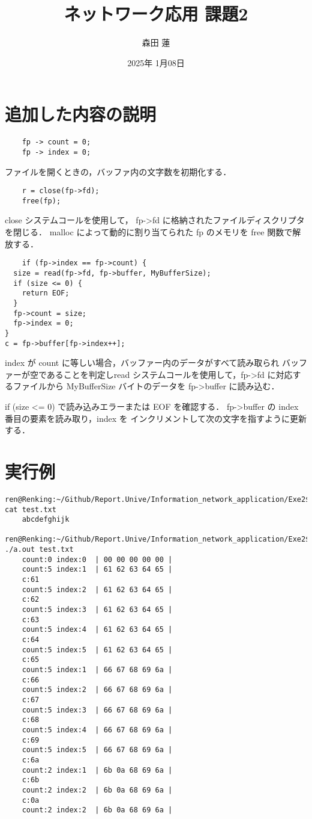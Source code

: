 \documentclass{jlreq}
\title{ネットワーク応用 課題2}
\author{森田 蓮}
\date{2025年 1月08日}
\begin{document}
\maketitle

\section{追加した内容の説明}
\begin{verbatim}
    fp -> count = 0;
    fp -> index = 0;
\end{verbatim}
ファイルを開くときの，バッファ内の文字数を初期化する．    

\begin{verbatim}
    r = close(fp->fd);
    free(fp);
\end{verbatim}

close システムコールを使用して，
fp->fd に格納されたファイルディスクリプタを閉じる．
malloc によって動的に割り当てられた fp のメモリを
free 関数で解放する．


\begin{verbatim}
    if (fp->index == fp->count) {
  size = read(fp->fd, fp->buffer, MyBufferSize);
  if (size <= 0) {
    return EOF;
  }
  fp->count = size;
  fp->index = 0;
}
c = fp->buffer[fp->index++];
\end{verbatim}
index が count に等しい場合，バッファー内のデータがすべて読み取られ
バッファーが空であることを判定しread システムコールを使用して，fp->fd
に対応するファイルから
 MyBufferSize バイトのデータを fp->buffer に読み込む．

 if (size <= 0) で読み込みエラーまたは EOF を確認する．
 fp->buffer の index 番目の要素を読み取り，index を
インクリメントして次の文字を指すように更新する．


\section{実行例}
\begin{lstlisting}[language={}, caption=実行結果]
    ren@Renking:~/Github/Report.Unive/Information_network_application/Exe2$ cat test.txt
    abcdefghijk
    ren@Renking:~/Github/Report.Unive/Information_network_application/Exe2$ ./a.out test.txt
    count:0 index:0  | 00 00 00 00 00 |
    count:5 index:1  | 61 62 63 64 65 |
    c:61
    count:5 index:2  | 61 62 63 64 65 |
    c:62
    count:5 index:3  | 61 62 63 64 65 |
    c:63
    count:5 index:4  | 61 62 63 64 65 |
    c:64
    count:5 index:5  | 61 62 63 64 65 |
    c:65
    count:5 index:1  | 66 67 68 69 6a |
    c:66
    count:5 index:2  | 66 67 68 69 6a |
    c:67
    count:5 index:3  | 66 67 68 69 6a |
    c:68
    count:5 index:4  | 66 67 68 69 6a |
    c:69
    count:5 index:5  | 66 67 68 69 6a |
    c:6a
    count:2 index:1  | 6b 0a 68 69 6a |
    c:6b
    count:2 index:2  | 6b 0a 68 69 6a |
    c:0a
    count:2 index:2  | 6b 0a 68 69 6a |
    \end{lstlisting}
\end{document}
